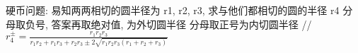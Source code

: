 硬币问题: 易知两两相切的圆半径为 r1, r2, r3, 求与他们都相切的圆的半径 r4
分母取负号, 答案再取绝对值, 为外切圆半径
分母取正号为内切圆半径
// $ r^{\pm}_4 = \frac{r_1 r_2 r_3}{r_1 r_2 + r_1 r_3 + r_2 r_3 \pm 2\sqrt{r_1r_2r_3(r_1 + r_2 + r_3)}} $
